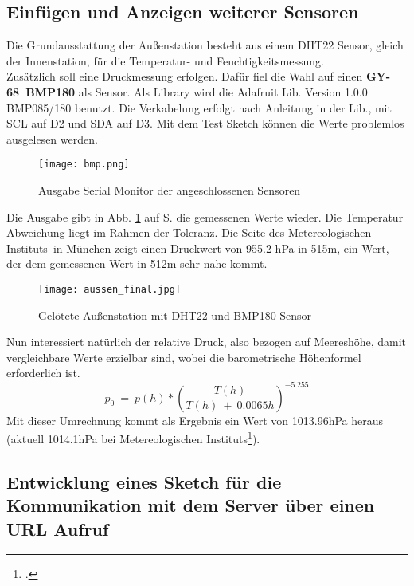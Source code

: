 \documentclass[12pt,a4paper]{scrartcl}	%
\begin{document}
\subsection{Einfügen und Anzeigen weiterer Sensoren}
Die Grundausstattung der Außenstation besteht aus einem DHT22 Sensor, gleich der Innenstation, für die Temperatur- und Feuchtigkeitsmessung.\\
Zusätzlich soll eine Druckmessung erfolgen. Dafür fiel die Wahl auf einen \textbf{GY-68~BMP180} als Sensor. Als Library wird die Adafruit Lib. Version 1.0.0 BMP085/180 benutzt.
Die Verkabelung erfolgt nach Anleitung in der Lib., mit SCL auf D2 und SDA auf D3.
Mit dem Test Sketch können die Werte problemlos ausgelesen werden.
\begin{figure}[htb]
	\centering
	\texttt{[image: bmp.png]}
	\caption{Ausgabe Serial Monitor der angeschlossenen Sensoren}
	\label{bmp}
\end{figure}
Die Ausgabe gibt in Abb. \ref{bmp} auf S. \pageref{bmp} die gemessenen Werte wieder. Die Temperatur Abweichung liegt im Rahmen der Toleranz. Die Seite des \glqq Metereologischen Instituts\grqq~in München zeigt einen Druckwert von 955.2 hPa in 515m, ein Wert, der dem gemessenen Wert in 512m sehr nahe kommt.
\begin{figure}[htb]
	\centering
	\texttt{[image: aussen\_final.jpg]}
	\caption{Gelötete Außenstation mit DHT22 und BMP180 Sensor}
\end{figure}
Nun interessiert natürlich der relative Druck, also bezogen auf Meereshöhe, damit vergleichbare Werte erzielbar sind, wobei die barometrische Höhenformel erforderlich ist.
\[p_{0}~=~ p(h)*\left( \frac{T(h)}{T(h)~+~0.0065h}\right)^{-5.255} \]
Mit dieser Umrechnung kommt als Ergebnis ein Wert von 1013.96hPa heraus (aktuell 1014.1hPa bei \glqq Metereologischen Instituts\grqq \footcite[vgl.][Abruf am 25.07.2018]{meteor}).


\subsection{Entwicklung eines Sketch für die Kommunikation mit dem Server über einen URL Aufruf} \label{comm}
\end{document}
